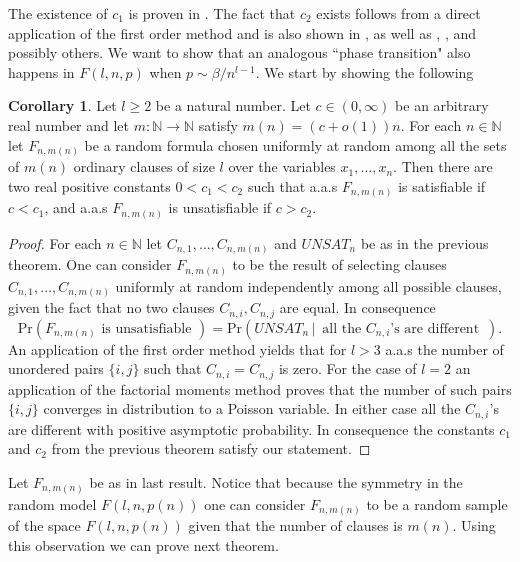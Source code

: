 \documentclass[12pt,notitlepage,a4paper]{article}
\theoremstyle{definition}
\newtheorem{corollary}{Corollary}[section]
\newcommand{\N}{\mathbb{N}}
\begin{document}
The existence of $c_1$ is proven in \cite[Theorem 1]{chvatal1992mick}.
The fact that $c_2$ exists follows from a direct application of
the first order method and is also shown in \cite{chvatal1992mick}, as well as 
\cite{franco1983probabilistic}, \cite{chvatal1988many}, \cite{simon1986etude}
and possibly others. We want to show that an analogous ``phase transition" also happens in
$F(l,n,p)$ when $p\sim \beta/n^{l-1}$. We start by showing the following
\begin{corollary}
	Let $l\geq 2$ be a natural number. Let $c\in (0,\infty)$ be an arbitrary
	real number and let $m:\N\rightarrow \N$ satisfy $m(n)=(c+o(1))n$. 
	For each $n\in \N$ let $F_{n,m(n)}$ be a random formula chosen uniformly at
	random among all the sets of $m(n)$ ordinary clauses of size $l$ over
	the variables $x_1,\dots, x_n$. Then there
	are two real positive constants $0<c_1<c_2$ such that
	a.a.s $F_{n,m(n)}$ is satisfiable if $c< c_1$, and
	a.a.s $F_{n,m(n)}$ is unsatisfiable if $c> c_2$.
\end{corollary}
\begin{proof}
For each $n\in \N$ let $C_{n,1},\dots, C_{n,m(n)}$ and $UNSAT_n$ be as in the previous theorem.
One can consider $F_{n,m(n)}$ to be the result of selecting clauses $C_{n,1},\dots, C_{n,m(n)}$
uniformly at random independently among all possible clauses, given the fact that
no two clauses $C_{n,i}, C_{n,j}$ are equal. In consequence 
\[
\mathrm{Pr} \left( F_{n,m(n)} \text{ is unsatisfiable } \right) 
=
\mathrm{Pr} \left(UNSAT_n \, \big| \, \text{ all the $C_{n,i}$'s are different }\,\right).
\] 
An application of the first
order method yields that for $l>3$ a.a.s the number of unordered pairs $\{i,j\}$ such that
$C_{n,i}=C_{n,j}$ is zero. For the case of $l=2$ an application of the factorial moments
method proves that the number of such pairs $\{i,j\}$ converges in distribution to 
a Poisson variable. In either case all the
$C_{n,i}$'s are different with positive asymptotic probability. 
In consequence the constants $c_1$ and $c_2$ from the previous theorem satisfy
our statement. 
\end{proof}

Let $F_{n,m(n)}$ be as in last result. Notice that because the symmetry in 
the random model $F(l,n,p(n))$ one can consider $F_{n,m(n)}$ to be a random
sample of the space $F(l,n,p(n))$ given that the number of clauses
is $m(n)$. Using this observation we can prove next theorem. 
  
\end{document}
